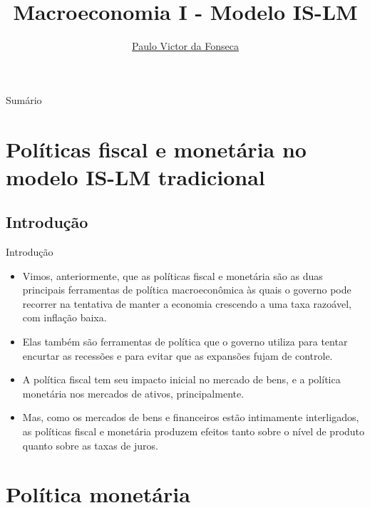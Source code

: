 \documentclass[10pt]{beamer}
\title[]{Macroeconomia I - Modelo IS-LM}
\author[]{\href{https://pvfonseca.github.io}{Paulo Victor da Fonseca}}
\date{}
\begin{document}
\begin{frame}[plain]
\end{frame}

\begin{frame}{Sumário}
    \tableofcontents
\end{frame}

\section{Políticas fiscal e monetária no modelo IS-LM tradicional}
\subsection{Introdução}
\begin{frame}{Introdução}
    \begin{itemize}
        \item Vimos, anteriormente, que as políticas fiscal e monetária são as duas principais ferramentas de política macroeconômica às quais o governo pode recorrer na tentativa de manter a economia crescendo a uma taxa razoável, com inflação baixa.
        \bigskip
        \item Elas também são ferramentas de política que o governo utiliza para tentar encurtar as recessões e para evitar que as expansões fujam de controle.
        \bigskip
        \item A política fiscal tem seu impacto inicial no mercado de bens, e a política monetária nos mercados de ativos, principalmente.
        \bigskip
        \item Mas, como os mercados de bens e financeiros estão intimamente interligados, as políticas fiscal e monetária produzem efeitos tanto sobre o nível de produto quanto sobre as taxas de juros.
    \end{itemize}
\end{frame}

\section{Política monetária}
\end{document}
